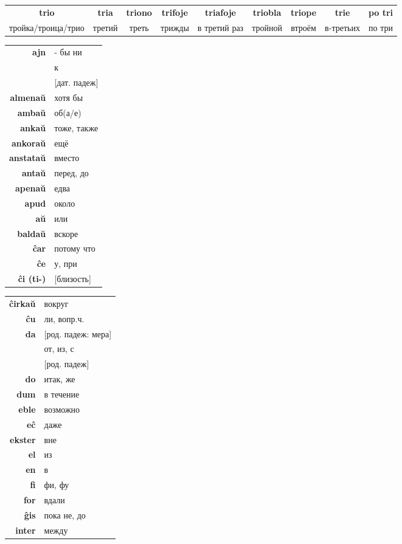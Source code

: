 \documentclass{article}
\def\b#1{\textbf{#1}}
\begin{document}
\begin{tabular}{|c|c|c|c|c|c|c|c|c|}
\hline
\b{trio} & \b{tria} & \b{triono} & \b{trifoje} & \b{triafoje} & \b{triobla} & \b{triope} & \b{trie} & \b{po tri} \\
тройка/троица/трио & третий & треть & трижды & в третий раз & тройной & втроём  & в-третьих & по три \\ 
\hline
\end{tabular}

\vspace{1em}
\begin{tabular}{|>{\bfseries}rl}
\hline
ajn & - бы ни \\
\multirow{2}{*}{al} & к \\
& {}[дат. падеж] \\
almenaŭ & хотя бы \\
ambaŭ & об(а/е) \\
ankaŭ & тоже, также \\
ankoraŭ & ещё \\
anstataŭ & вместо \\
antaŭ & перед, до \\
apenaŭ & едва \\
apud & около \\
aŭ & или \\
baldaŭ & вскоре \\
ĉar & потому что \\
ĉe & у, при \\
ĉi (ti-) & {}[близость] \\
\hline
\end{tabular}
\hspace{-1em}
\begin{tabular}{>{\bfseries}rl}
\hline
ĉirkaŭ & вокруг \\
ĉu & ли, вопр.ч. \\
da & {}[род. падеж: мера] \\
\multirow{2}{*}{de} & от, из, с \\
& {}[род. падеж] \\
do & итак, же \\
dum & в течение \\
eble & возможно \\
eĉ & даже \\
ekster & вне \\
el & из \\
en & в \\
fi & фи, фу \\
for & вдали \\
ĝis & пока не, до \\
inter & между \\
\hline
\end{tabular}
\end{document}
